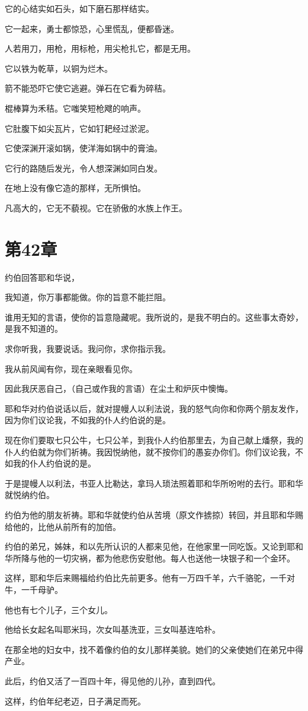 \documentclass[12pt,oneside]{book}
\begin{document}
它的心结实如石头，如下磨石那样结实。

它一起来，勇士都惊恐，心里慌乱，便都昏迷。

人若用刀，用枪，用标枪，用尖枪扎它，都是无用。

它以铁为乾草，以铜为烂木。

箭不能恐吓它使它逃避。弹石在它看为碎秸。

棍棒算为禾秸。它嗤笑短枪飕的响声。

它肚腹下如尖瓦片，它如钉耙经过淤泥。

它使深渊开滚如锅，使洋海如锅中的膏油。

它行的路随后发光，令人想深渊如同白发。

在地上没有像它造的那样，无所惧怕。

凡高大的，它无不藐视。它在骄傲的水族上作王。


\chapter{第42章}
约伯回答耶和华说，

我知道，你万事都能做。你的旨意不能拦阻。

谁用无知的言语，使你的旨意隐藏呢。我所说的，是我不明白的。这些事太奇妙，是我不知道的。

求你听我，我要说话。我问你，求你指示我。

我从前风闻有你，现在亲眼看见你。

因此我厌恶自己，（自己或作我的言语）在尘土和炉灰中懊悔。

耶和华对约伯说话以后，就对提幔人以利法说，我的怒气向你和你两个朋友发作，因为你们议论我，不如我的仆人约伯说的是。

现在你们要取七只公牛，七只公羊，到我仆人约伯那里去，为自己献上燔祭，我的仆人约伯就为你们祈祷。我因悦纳他，就不按你们的愚妄办你们。你们议论我，不如我的仆人约伯说的是。

于是提幔人以利法，书亚人比勒达，拿玛人琐法照着耶和华所吩咐的去行。耶和华就悦纳约伯。

约伯为他的朋友祈祷。耶和华就使约伯从苦境（原文作掳掠）转回，并且耶和华赐给他的，比他从前所有的加倍。

约伯的弟兄，姊妹，和以先所认识的人都来见他，在他家里一同吃饭。又论到耶和华所降与他的一切灾祸，都为他悲伤安慰他。每人也送他一块银子和一个金环。

这样，耶和华后来赐福给约伯比先前更多。他有一万四千羊，六千骆驼，一千对牛，一千母驴。

他也有七个儿子，三个女儿。

他给长女起名叫耶米玛，次女叫基洗亚，三女叫基连哈朴。

在那全地的妇女中，找不着像约伯的女儿那样美貌。她们的父亲使她们在弟兄中得产业。

此后，约伯又活了一百四十年，得见他的儿孙，直到四代。

这样，约伯年纪老迈，日子满足而死。
\end{document}
